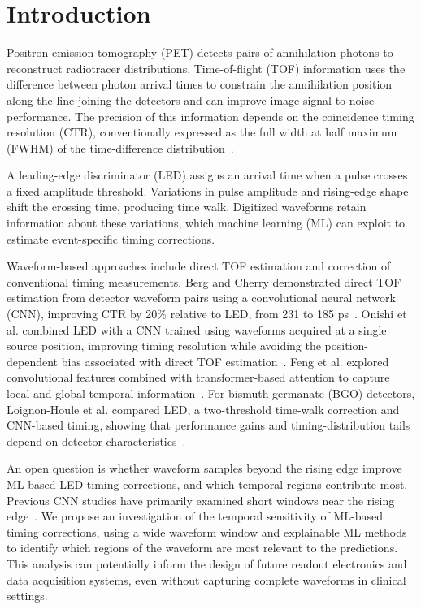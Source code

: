 \section{Introduction}
Positron emission tomography (PET) detects pairs of annihilation photons to reconstruct
radiotracer distributions. Time-of-flight (TOF) information uses the difference between
photon arrival times to constrain the annihilation position along the line joining the
detectors and can improve image signal-to-noise performance. The precision of this
information depends on the coincidence timing resolution (CTR), conventionally expressed
as the full width at half maximum (FWHM) of the time-difference distribution~\cite{surti2015}.

A leading-edge discriminator (LED) assigns an arrival time when a pulse crosses a fixed
amplitude threshold. Variations in pulse amplitude and rising-edge shape shift the crossing
time, producing time walk. Digitized waveforms retain information about these variations,
which machine learning (ML) can exploit to estimate event-specific timing corrections.

Waveform-based approaches include direct TOF estimation and correction of conventional
timing measurements. Berg and Cherry demonstrated direct TOF estimation from detector
waveform pairs using a convolutional neural network (CNN), improving CTR by 20\% relative
to LED, from 231 to 185 ps~\cite{berg2018}. Onishi et al. combined LED with a CNN
trained using waveforms acquired at a single source position, improving timing
resolution while avoiding the position-dependent bias associated with direct TOF
estimation~\cite{onishi2022}. Feng et al. explored convolutional features combined with
transformer-based attention to capture local and global temporal information~\cite{feng2024}.
For bismuth germanate (BGO) detectors, Loignon-Houle et al. compared LED, a
two-threshold time-walk correction and CNN-based timing, showing that performance gains
and timing-distribution tails depend on detector characteristics~\cite{loignon2025}.

An open question is whether waveform samples beyond the rising edge improve
ML-based LED timing corrections, and which temporal regions contribute most.
Previous CNN studies have primarily examined short windows near the rising
edge~\cite{onishi2022,loignon2025}. We propose an investigation of the temporal 
sensitivity of ML-based timing corrections, using a wide waveform window
and explainable ML methods to identify which regions of the waveform are most relevant to the
predictions. This analysis can potentially inform the design of future readout 
electronics and data acquisition systems, even without capturing complete waveforms 
in clinical settings.

